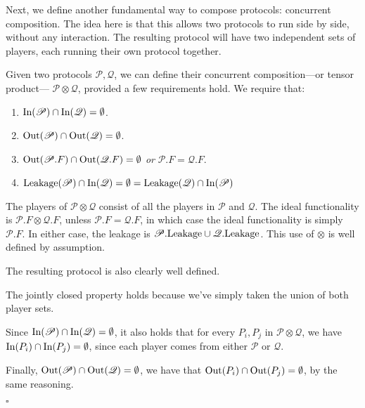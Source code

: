 Next, we define another fundamental way to compose protocols:
concurrent composition.
The idea here is that this allows two protocols to run side
by side, without any interaction.
The resulting protocol will have two independent sets of players,
each running their own protocol together.

\begin{definition}
Given two protocols $\mathscr{P}, \mathscr{Q}$,
we can define their concurrent composition---or tensor product---
$\mathscr{P} \otimes \mathscr{Q}$, provided a few requirements hold.
We require that:
\begin{enumerate}
\item $\text{In}(\mathscr{P}) \cap \text{In}(\mathscr{Q}) = \emptyset$.
\item $\text{Out}(\mathscr{P}) \cap \text{Out}(\mathscr{Q}) = \emptyset$.
\item $\text{Out}(\mathscr{P}.F) \cap \text{Out}(\mathscr{Q}.F) = \emptyset$ \emph{or} $\mathscr{P}.F = \mathscr{Q}.F$.
\item $\text{Leakage}(\mathscr{P}) \cap \text{In}(\mathscr{Q}) = \emptyset = \text{Leakage}(\mathscr{Q}) \cap \text{In}(\mathscr{P})$
\end{enumerate}

The players of $\mathscr{P} \otimes \mathscr{Q}$ consist of all the players
in $\mathscr{P}$ and $\mathscr{Q}$.
The ideal functionality is $\mathscr{P}.F \otimes \mathscr{Q}.F$, 
unless $\mathscr{P}.F = \mathscr{Q}.F$, in which case the ideal functionality
is simply $\mathscr{P}.F$.
In either case, the leakage is $\mathscr{P}.\text{Leakage} \cup \mathscr{Q}.\text{Leakage}$.
This use of $\otimes$ is well defined by assumption.

The resulting protocol is also clearly well defined.

The jointly closed property holds because we've simply taken the union
of both player sets.

Since $\text{In}(\mathscr{P}) \cap \text{In}(\mathscr{Q}) = \emptyset$,
it also holds that for every $P_i, P_j$ in $\mathscr{P} \otimes \mathscr{Q}$,
we have $\text{In}(P_i) \cap \text{In}(P_j) = \emptyset$,
since each player comes from either $\mathscr{P}$ or $\mathscr{Q}$.
      
Finally, $\text{Out}(\mathscr{P}) \cap \text{Out}(\mathscr{Q}) = \emptyset$,
we have that $\text{Out}(P_i) \cap \text{Out}(P_j) = \emptyset$,
by the same reasoning.
    
$\square$
\end{definition}

